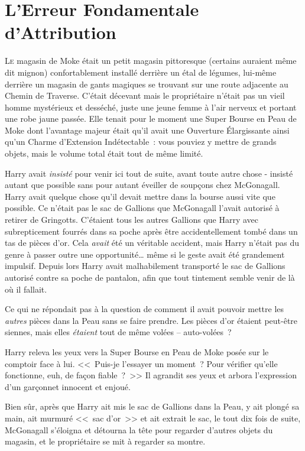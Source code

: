\chapter{L'Erreur Fondamentale d'Attribution}

\lettrine{L}{e} magasin de Moke était un petit magasin pittoresque (certains auraient même dit mignon) confortablement installé derrière un étal de légumes, lui-même derrière un magasin de gants magiques se trouvant sur une route adjacente au Chemin de Traverse. C'était décevant mais le propriétaire n'était pas un vieil homme mystérieux et desséché, juste une jeune femme à l'air nerveux et portant une robe jaune passée. Elle tenait pour le moment une Super Bourse en Peau de Moke  dont l'avantage majeur était qu'il avait une Ouverture Élargissante ainsi qu'un Charme d'Extension Indétectable~: vous pouviez y mettre de grands objets, mais le volume total était tout de même limité.

Harry avait \emph{insisté} pour venir ici tout de suite, avant toute autre chose - insisté autant que possible sans pour autant éveiller de soupçons chez McGonagall. Harry avait quelque chose qu'il devait mettre dans la bourse aussi vite que possible. Ce n'était pas le sac de Gallions que McGonagall l'avait autorisé à retirer de Gringotts. C'étaient tous les autres Gallions que Harry avec subrepticement fourrés dans sa poche après être accidentellement tombé dans un tas de pièces d'or. Cela \emph{avait} été un véritable accident, mais Harry n'était pas du genre à passer outre une opportunité… même si le geste avait été grandement impulsif. Depuis lors Harry avait malhabilement transporté le sac de Gallions autorisé contre sa poche de pantalon, afin que tout tintement semble venir de là où il fallait.

Ce qui ne répondait pas à la question de comment il avait pouvoir mettre les \emph{autres} pièces dans la Peau sans se faire prendre. Les pièces d'or étaient peut-être siennes, mais elles \emph{étaient} tout de même volées -- auto-volées~?

Harry releva les yeux vers la Super Bourse en Peau de Moke  posée sur le comptoir face à lui. <<~Puis-je l'essayer un moment~? Pour vérifier qu'elle fonctionne, euh, de façon fiable~?~>> Il agrandit ses yeux et arbora l'expression d'un garçonnet innocent et enjoué.

Bien sûr, après que Harry ait mis le sac de Gallions dans la Peau, y ait plongé sa main, ait murmuré <<~sac d'or~>> et ait extrait le sac, le tout dix fois de suite, McGonagall s'éloigna et détourna la tête pour regarder d'autres objets du magasin, et le propriétaire se mit à regarder sa montre.

